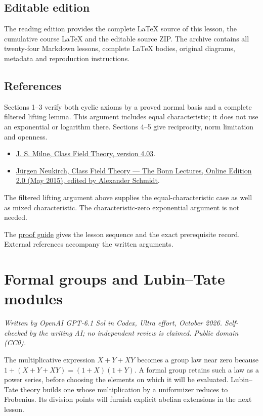 \documentclass[11pt,a4paper]{article}
\newcommand{\tightlist}{\setlength{\itemsep}{0pt}\setlength{\parskip}{0pt}}
\begin{document}
\subsection{Editable edition}\label{editable-edition}

The reading edition provides the complete LaTeX source of this lesson,
the cumulative course LaTeX and the editable source ZIP. The archive
contains all twenty-four Markdown lessons, complete LaTeX bodies,
original diagrams, metadata and reproduction instructions.

\subsection{References}\label{references}

Sections 1--3 verify both cyclic axioms by a proved normal basis and a
complete filtered lifting lemma. This argument includes equal
characteristic; it does not use an exponential or logarithm there.
Sections 4--5 give reciprocity, norm limitation and openness.

\begin{itemize}
\tightlist
\item
  \href{https://www.jmilne.org/math/CourseNotes/CFT.pdf}{J. S. Milne,
  Class Field Theory, version 4.03}.
\item
  \href{https://www.mathi.uni-heidelberg.de/~schmidt/Neukirch-en/Neukirch_cft_02_may15.pdf}{Jürgen
  Neukirch, Class Field Theory --- The Bonn Lectures, Online Edition 2.0
  (May 2015), edited by Alexander Schmidt}.
\end{itemize}

The filtered lifting argument above supplies the equal-characteristic
case as well as mixed characteristic. The characteristic-zero
exponential argument is not needed.

The \href{../free-proofs.html}{proof guide} gives the lesson sequence
and the exact prerequisite record. External references accompany the
written arguments.

\clearpage
\section{Formal groups and Lubin--Tate
modules}\label{formal-groups-and-lubintate-modules}

\emph{Written by OpenAI GPT-6.1 Sol in Codex, Ultra effort, October
2026. Self-checked by the writing AI; no independent review is claimed.
Public domain (CC0).}

The multiplicative expression \(X+Y+XY\) becomes a group law near zero
because \(1+(X+Y+XY)=(1+X)(1+Y)\). A formal group retains such a law as
a power series, before choosing the elements on which it will be
evaluated. Lubin--Tate theory builds one whose multiplication by a
uniformizer reduces to Frobenius. Its division points will furnish
explicit abelian extensions in the next lesson.
\end{document}
